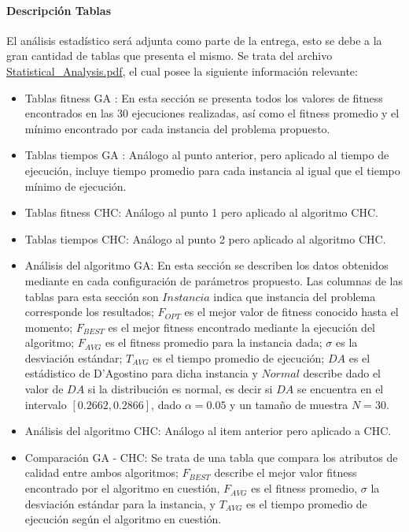 \documentclass[journal]{IEEEtran}
\begin{document}
\paragraph{Descripción Tablas}
El análisis estadístico será adjunta como parte de la entrega, esto se debe a la gran cantidad de tablas que presenta el mismo. Se trata del archivo \href{./Statistical\_Analysis.pdf}{Statistical\_Analysis.pdf}, el cual posee la siguiente información relevante:
\begin{itemize}
  \item Tablas fitness GA : En esta sección se presenta todos los valores de fitness encontrados en las 30 ejecuciones realizadas, así como el fitness promedio y el mínimo encontrado por cada instancia del problema propuesto.
  \item Tablas tiempos GA : Análogo al punto anterior, pero aplicado al tiempo de ejecución, incluye tiempo promedio para cada instancia al igual que el tiempo mínimo de ejecución.
  \item Tablas fitness CHC: Análogo al punto 1 pero aplicado al algoritmo CHC.
  \item Tablas tiempos CHC: Análogo al punto 2 pero aplicado al algoritmo CHC.
  \item Análisis del algoritmo GA: En esta sección se describen los datos obtenidos mediante en cada configuración de parámetros propuesto. Las columnas de las tablas para esta sección son $Instancia$ indica que instancia del problema corresponde los resultados; $F_{OPT}$ es el mejor valor de fitness conocido hasta el momento; $F_{BEST}$ es el mejor fitness encontrado mediante la ejecución del algoritmo; $F_{AVG}$ es el fitness promedio para la instancia dada; $\sigma$ es la desviación estándar; $T_{AVG}$ es el tiempo promedio de ejecución; $DA$ es el estádistico de D'Agostino para dicha instancia y $Normal$ describe dado el valor de $DA$ si la distribución es normal, es decir si $DA$ se encuentra en el intervalo  $[0.2662, 0.2866]$, dado $\alpha=0.05$ y un tamaño de muestra $N=30$.
  \item Análisis del algoritmo CHC: Análogo al item anterior pero aplicado a CHC.
  \item Comparación GA - CHC: Se trata de una tabla que compara los atributos de calidad entre ambos algoritmos; $F_{BEST}$ describe el mejor valor fitness encontrado por el algoritmo en cuestión, $F_{AVG}$ es el fitness promedio, $\sigma$ la desviación estándar para la instancia, y $T_{AVG}$ es el tiempo promedio de ejecución según el algoritmo en cuestión.

\end{itemize}
\end{document}
